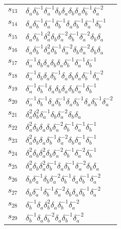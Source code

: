 \documentclass{article}
\begin{document}
\begin{center}
\begin{tabular}{ll}
$s_{13}$ & $\delta_a^{}\delta_b^{-1}\delta_a^{-1}\delta_b^{}\delta_a^{}\delta_b^{}\delta_a^{}\delta_b^{-1}\delta_a^{-2}$ \\
$s_{14}$ & $\delta_a^{}\delta_b^{-1}\delta_a^{-1}\delta_b^{-1}\delta_a^{}\delta_b^{-1}\delta_a^{-1}\delta_b^{-1}$ \\
$s_{15}$ & $\delta_a^{}\delta_b^{-1}\delta_a^{2}\delta_b^{}\delta_a^{-2}\delta_b^{-1}\delta_a^{-2}\delta_b^{}\delta_a^{}$ \\
$s_{16}$ & $\delta_a^{}\delta_b^{-1}\delta_a^{2}\delta_b^{-1}\delta_a^{-2}\delta_b^{}\delta_a^{-2}\delta_b^{}\delta_a^{}$ \\
$s_{17}$ & $\delta_a^{-1}\delta_b^{}\delta_a^{}\delta_b^{}\delta_a^{}\delta_b^{-1}\delta_a^{-1}\delta_b^{-1}$ \\
$s_{18}$ & $\delta_a^{-1}\delta_b^{}\delta_a^{}\delta_b^{-1}\delta_a^{}\delta_b^{}\delta_a^{}\delta_b^{-1}\delta_a^{-2}$ \\
$s_{19}$ & $\delta_a^{-1}\delta_b^{-1}\delta_a^{}\delta_b^{}\delta_a^{}\delta_b^{}\delta_a^{-1}\delta_b^{-1}$ \\
$s_{20}$ & $\delta_a^{-1}\delta_b^{-1}\delta_a^{}\delta_b^{-1}\delta_a^{}\delta_b^{-1}\delta_a^{}\delta_b^{-1}\delta_a^{-2}$ \\
$s_{21}$ & $\delta_a^{2}\delta_b^{2}\delta_a^{-1}\delta_b^{}\delta_a^{-2}\delta_b^{}\delta_a^{}$ \\
$s_{22}$ & $\delta_a^{2}\delta_b^{}\delta_a^{}\delta_b^{}\delta_a^{-2}\delta_b^{-1}\delta_a^{-1}\delta_b^{-1}$ \\
$s_{23}$ & $\delta_a^{2}\delta_b^{}\delta_a^{}\delta_b^{-1}\delta_a^{-2}\delta_b^{}\delta_a^{-1}\delta_b^{-1}$ \\
$s_{24}$ & $\delta_a^{2}\delta_b^{}\delta_a^{2}\delta_b^{}\delta_a^{-2}\delta_b^{-1}\delta_a^{-2}\delta_b^{-1}$ \\
$s_{25}$ & $\delta_a^{2}\delta_b^{}\delta_a^{2}\delta_b^{-1}\delta_a^{}\delta_b^{-1}\delta_a^{-2}\delta_b^{}\delta_a^{}$ \\
$s_{26}$ & $\delta_b^{}\delta_a^{-1}\delta_b^{}\delta_a^{-2}\delta_b^{-1}\delta_a^{}\delta_b^{-1}\delta_a^{-2}$ \\
$s_{27}$ & $\delta_b^{}\delta_a^{-1}\delta_b^{-1}\delta_a^{-2}\delta_b^{}\delta_a^{}\delta_b^{-1}\delta_a^{-2}$ \\
$s_{28}$ & $\delta_b^{-1}\delta_a^{}\delta_b^{2}\delta_a^{}\delta_b^{-1}\delta_a^{-2}$ \\
$s_{29}$ & $\delta_b^{-1}\delta_a^{}\delta_b^{-2}\delta_a^{}\delta_b^{-1}\delta_a^{-2}$ \\

\end{tabular}
\end{center}
\end{document}
